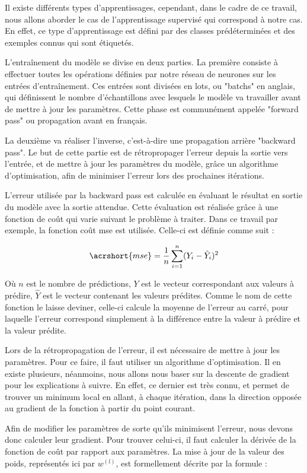 Il existe différents types d'apprentissages, cependant, dans le cadre de ce travail, nous allons aborder le cas de l'apprentissage supervisé qui correspond à notre cas. En effet, ce type d'apprentissage est défini par des classes prédéterminées et des exemples connus qui sont étiquetés.

L'entraînement du modèle se divise en deux parties. La première consiste à effectuer toutes les opérations définies par notre réseau de neurones sur les entrées d'entraînement. Ces entrées sont divisées en lots, ou "batchs" en anglais, qui définissent le nombre d'échantillons avec lesquels le modèle va travailler avant de mettre à jour les paramètres. Cette phase est communément appelée "forward pass" ou propagation avant en français.

La deuxième va réaliser l'inverse, c'est-à-dire une propagation arrière "backward pass". Le but de cette partie est de rétropropager l'erreur depuis la sortie vers l'entrée, et de mettre à jour les paramètres du modèle, grâce un algorithme d'optimisation, afin de minimiser l'erreur lors des prochaines itérations.

L'erreur utilisée par la backward pass est calculée en évaluant le résultat en sortie du modèle avec la sortie attendue. Cette évaluation est réalisée grâce à une fonction de coût qui varie suivant le problème à traiter. Dans ce travail par exemple, la fonction coût \acrfull{mse} est utilisée. Celle-ci est définie comme suit :

\[\acrshort{mse}=\frac{1}{n}\sum^{n}_{i=1} (Y_i-\hat{Y}_i)^{2}\]

Où $n$ est le nombre de prédictions, $Y$ est le vecteur correspondant aux valeurs à prédire, $\hat{Y}$ est le vecteur contenant les valeurs prédites. Comme le nom de cette fonction le laisse deviner, celle-ci calcule la moyenne de l'erreur au carré, pour laquelle l'erreur correspond simplement à la différence entre la valeur à prédire et la valeur prédite.

Lors de la rétropropagation de l'erreur, il est nécessaire de mettre à jour les paramètres. Pour ce faire, il faut utiliser un algorithme d'optimisation. Il en existe plusieurs, néanmoins, nous allons nous baser sur la descente de gradient pour les explications à suivre. En effet, ce dernier est très connu, et permet de trouver un minimum local en allant, à chaque itération, dans la direction opposée au gradient de la fonction à partir du point courant.

Afin de modifier les paramètres de sorte qu'ils minimisent l'erreur, nous devons donc calculer leur gradient. Pour trouver celui-ci, il faut calculer la dérivée de la fonction de coût par rapport aux paramètres. La mise à jour de la valeur des poids, représentés ici par $w^{(l)}$, est formellement décrite par la formule :

